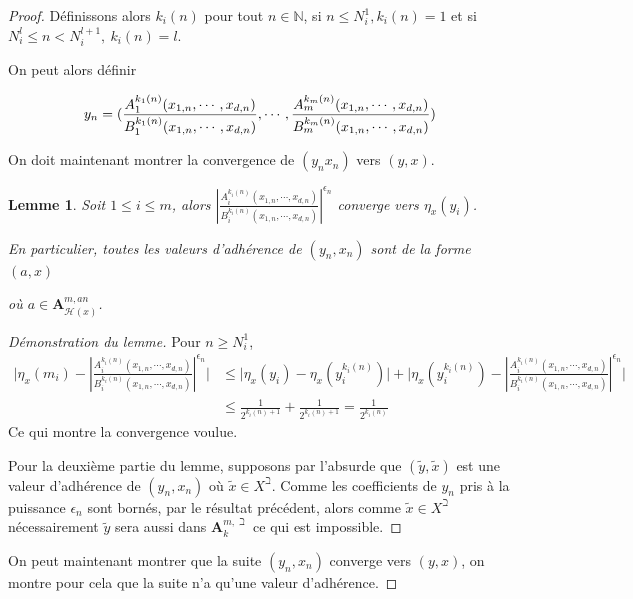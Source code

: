 \documentclass[11pt]{article}
\newcommand{\N}{\mathbb{N}}
\newcommand{\ana}{\mathbf{A}}
\newtheorem{lem}[thm]{Lemme}
\begin{document}
\begin{proof}
Définissons alors $k_{i}(n)$ pour tout $n \in \N$, si $n\leq N^{1}_{i}, k_{i}(n) = 1$ et si $ N_{i}^l \leq n < N_{i}^{l+1},~ k_{i}(n) = l$.

On peut alors définir 

$$y_n = (
\frac{A^{k_{1}(n)}_{1}(x_{1,n}, \cdots, x_{d,n})}{B^{k_{1}(n)}_{1}(x_{1,n}, \cdots, x_{d,n})}, \cdots,\frac{A^{k_{m}(n)}_{m}(x_{1,n}, \cdots, x_{d,n})}{B^{k_{m}(n)}_{m}(x_{1,n}, \cdots, x_{d,n})} ) \\
$$

On doit maintenant montrer la convergence de $(y_n x_n)$ vers $(y,x)$.

\begin{lem}
Soit $1\leq i \leq m$, alors $|\frac{A^{k_{i}(n)}_{i}(x_{1,n}, \cdots, x_{d,n})}{B^{k_{i}(n)}_{i}(x_{1,n}, \cdots, x_{d,n})}|^{\epsilon_n}$ converge vers $\eta_x(y_{i})$. 

En particulier, toutes les valeurs d'adhérence de $(y_n, x_n)$ sont de la forme $(a,x)$ 

où $a \in \ana^{m,an}_{\mathcal{H}(x)}$.
\end{lem}
\begin{proof}[Démonstration du lemme]
Pour $n \geq N^1_{i}$, 
\begin{align*}
\Biggr\lvert \eta_x(m_{i}) - |\frac{A^{k_{i}(n)}_{i}(x_{1,n}, \cdots, x_{d,n})}{B^{k_{i}(n)}_{i}(x_{1,n}, \cdots, x_{d,n})}|^{\epsilon_n} \Biggr\rvert &\leq \Biggr\lvert \eta_x(y_{i}) - \eta_x(y_{i}^{k_{i}(n)})\Biggr\rvert +  \Biggr\lvert \eta_x(y^{k_{i}(n)}_{i}) - |\frac{A^{k_{i}(n)}_{i}(x_{1,n}, \cdots, x_{d,n})}{B^{k_{i}(n)}_{i}(x_{1,n}, \cdots, x_{d,n})}|^{\epsilon_n}\Biggr\rvert\\
&\leq \frac{1}{2^{k_{i}(n)+1}} + \frac{1}{2^{k_{i}(n)+1}} = \frac{1}{2^{k_{i}(n)}} 
\end{align*} 
Ce qui montre la convergence voulue. 

Pour la deuxième partie du lemme, supposons par l'absurde que $(\tilde{y}, \tilde{x})$ est une valeur d'adhérence de $(y_n, x_n)$ où $\tilde{x} \in X^{\beth}$. Comme les coefficients de $y_n$ pris à la puissance $\epsilon_n$ sont bornés, par le résultat précédent, alors comme $\tilde{x} \in X^\beth$ nécessairement $\tilde{y}$ sera aussi dans $\ana^{m,\beth}_k$ ce qui est impossible. 
\end{proof}

On peut maintenant montrer que la suite $(y_n, x_n)$ converge vers $(y,x)$, on montre pour cela que la suite n'a qu'une valeur d'adhérence. 


\end{proof}
\end{document}
